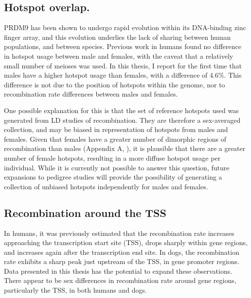 \subsection{Hotspot overlap.}

PRDM9 has been shown to undergo rapid evolution within its DNA-binding zinc finger array\cite{Oliver2009,Ponting2011}, and this evolution underlies the lack of sharing between human populations\cite{Hinch2011}, and between species\cite{Auton2012a}.
Previous work in humans found no difference in hotspot usage between male and females\cite{Coop2008}, with the caveat that a relatively small number of meioses was used.
In this thesis, I report for the first time that males have a higher hotspot usage than females, with a difference of 4.6\%.
This difference is not due to the position of hotspots within the genome, nor to recombination rate differences between males and females.

One possible explanation for this is that the set of reference hotspots used was generated from LD studies of recombination\cite{Myers2005,hapmap2007}.
They are therefore a sex-averaged collection, and may be biased in representation of hotspots from males and females.
Given that females have a greater number of dimorphic regions of recombination than males (Appendix A, \citet{Bherer2016}), it is plausible that there are a greater number of female hotspots, resulting in a more diffuse hotspot usage per individual.
While it is currently not possible to answer this question, future expansions to pedigree studies will provide the possibility of generating a collection of unbiased hotspots independently for males and females.


\subsection{Recombination around the TSS}

In humans, it was previously estimated that the recombination rate increases approaching the transcription start site (TSS), drops sharply within gene regions, and increases again after the transcription end site\cite{Mcvean2004,Myers2005,hapmap2007,Spencer2006,Kong2010}.
In dogs, the recombination rate exhibits a sharp peak just upstream of the TSS, in gene promoter regions\cite{Auton2013}.
Data presented in this thesis has the potential to expand these observations.
There appear to be sex differences in recombination rate around gene regions, particularly the TSS, in both humans and dogs.

